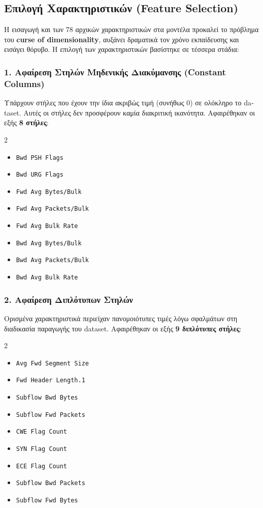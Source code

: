 \documentclass[11pt,a4paper]{article}
\newcommand{\eng}[1]{\textlatin{#1}}
\begin{document}
\subsection{Επιλογή Χαρακτηριστικών (\eng{Feature Selection})}
Η εισαγωγή και των 78 αρχικών χαρακτηριστικών στα μοντέλα προκαλεί το πρόβλημα του \textbf{\eng{curse of dimensionality}}, αυξάνει δραματικά τον χρόνο εκπαίδευσης και εισάγει θόρυβο. Η επιλογή των χαρακτηριστικών βασίστηκε σε τέσσερα στάδια:

\subsubsection{1. Αφαίρεση Στηλών Μηδενικής Διακύμανσης (\eng{Constant Columns})}
Υπάρχουν στήλες που έχουν την ίδια ακριβώς τιμή (συνήθως $0$) σε ολόκληρο το \eng{dataset}. Αυτές οι στήλες δεν προσφέρουν καμία διακριτική ικανότητα. Αφαιρέθηκαν οι εξής \textbf{8 στήλες}:
\begin{multicols}{2}
\begin{itemize}
    \item \texttt{\eng{Bwd PSH Flags}}
    \item \texttt{\eng{Bwd URG Flags}}
    \item \texttt{\eng{Fwd Avg Bytes/Bulk}}
    \item \texttt{\eng{Fwd Avg Packets/Bulk}}
    \item \texttt{\eng{Fwd Avg Bulk Rate}}
    \item \texttt{\eng{Bwd Avg Bytes/Bulk}}
    \item \texttt{\eng{Bwd Avg Packets/Bulk}}
    \item \texttt{\eng{Bwd Avg Bulk Rate}}
\end{itemize}
\end{multicols}

\subsubsection{2. Αφαίρεση Διπλότυπων Στηλών}
Ορισμένα χαρακτηριστικά περιείχαν πανομοιότυπες τιμές λόγω σφαλμάτων στη διαδικασία παραγωγής του \eng{dataset}. Αφαιρέθηκαν οι εξής \textbf{9 διπλότυπες στήλες}:
\begin{multicols}{2}
\begin{itemize}
    \item \texttt{\eng{Avg Fwd Segment Size}}
    \item \texttt{\eng{Fwd Header Length.1}}
    \item \texttt{\eng{Subflow Bwd Bytes}}
    \item \texttt{\eng{Subflow Fwd Packets}}
    \item \texttt{\eng{CWE Flag Count}}
    \item \texttt{\eng{SYN Flag Count}}
    \item \texttt{\eng{ECE Flag Count}}
    \item \texttt{\eng{Subflow Bwd Packets}}
    \item \texttt{\eng{Subflow Fwd Bytes}}
\end{itemize}
\end{multicols}
\end{document}
